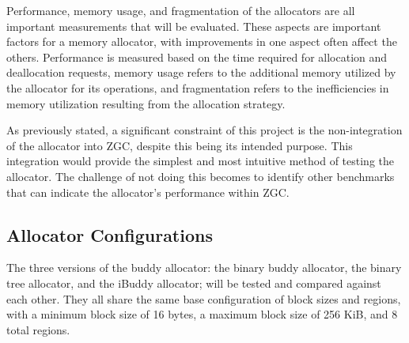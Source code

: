Performance, memory usage, and fragmentation of the allocators are all important measurements that will be evaluated. These aspects are important factors for a memory allocator, with improvements in one aspect often affect the others. Performance is measured based on the time required for allocation and deallocation requests, memory usage refers to the additional memory utilized by the allocator for its operations, and fragmentation refers to the inefficiencies in memory utilization resulting from the allocation strategy.

As previously stated, a significant constraint of this project is the non-integration of the allocator into ZGC, despite this being its intended purpose. This integration would provide the simplest and most intuitive method of testing the allocator. The challenge of not doing this becomes to identify other benchmarks that can indicate the allocator's performance within ZGC.

\subsection{Allocator Configurations}
The three versions of the buddy allocator: the binary buddy allocator, the binary tree allocator, and the iBuddy allocator; will be tested and compared against each other. They all share the same base configuration of block sizes and regions, with a minimum block size of 16 bytes, a maximum block size of 256 KiB, and 8 total regions.





